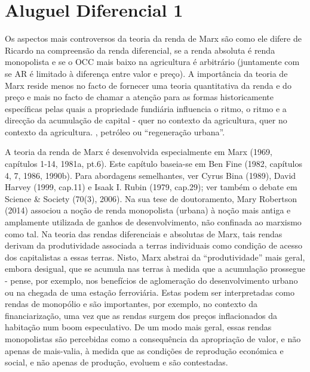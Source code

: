 \section{Aluguel Diferencial 1}
 \par 
Os aspectos mais controversos da teoria da renda de Marx são como ele difere de Ricardo na compreensão da renda diferencial, se a renda absoluta é renda monopolista e se o OCC mais baixo na agricultura é arbitrário (juntamente com se AR é limitado à diferença entre valor e preço). A importância da teoria de Marx reside menos no facto de fornecer uma teoria quantitativa da renda e do preço e mais no facto de chamar a atenção para as formas historicamente específicas pelas quais a propriedade fundiária influencia o ritmo, o ritmo e a direcção da acumulação de capital - quer no contexto da agricultura, quer no contexto da agricultura. , petróleo ou “regeneração urbana”.
 \par 
A teoria da renda de Marx é desenvolvida especialmente em Marx (1969, capítulos 1-14, 1981a, pt.{\color{blue}6}). Este capítulo baseia-se em Ben Fine (1982, capítulos 4, 7, 1986, 1990b). Para abordagens semelhantes, ver Cyrus Bina (1989), David Harvey (1999, cap.{\color{blue}11}) e Isaak I. Rubin (1979, cap.{\color{blue}29}); ver também o debate em Science & Society (70(3), 2006). Na sua tese de doutoramento, Mary Robertson (2014) associou a noção de renda monopolista (urbana) à noção mais antiga e amplamente utilizada de ganhos de desenvolvimento, não confinada ao marxismo como tal. Na teoria das rendas diferenciais e absolutas de Marx, tais rendas derivam da produtividade associada a terras individuais como condição de acesso dos capitalistas a essas terras. Nisto, Marx abstrai da “produtividade” mais geral, embora desigual, que se acumula nas terras à medida que a acumulação prossegue - pense, por exemplo, nos benefícios de aglomeração do desenvolvimento urbano ou na chegada de uma estação ferroviária. Estas podem ser interpretadas como rendas de monopólio e são importantes, por exemplo, no contexto da financiarização, uma vez que as rendas surgem dos preços inflacionados da habitação num boom especulativo. De um modo mais geral, essas rendas monopolistas são percebidas como a consequência da apropriação de valor, e não apenas de mais-valia, à medida que as condições de reprodução económica e social, e não apenas de produção, evoluem e são contestadas.
